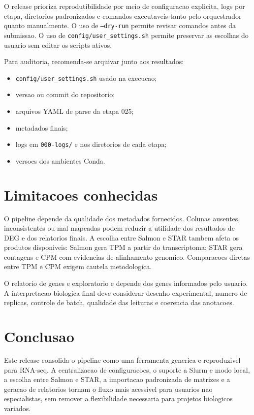 \documentclass[
  12pt,
  oneside,
  a4paper,
  chapter=TITLE,
  section=TITLE,
  brazil
]{abntex2}
\begin{document}
O release prioriza reprodutibilidade por meio de configuracao explicita, logs por etapa, diretorios padronizados e comandos executaveis tanto pelo orquestrador quanto manualmente. O uso de \texttt{--dry-run} permite revisar comandos antes da submissao. O uso de \texttt{config/user\_settings.sh} permite preservar as escolhas do usuario sem editar os scripts ativos.

Para auditoria, recomenda-se arquivar junto aos resultados:

\begin{itemize}[noitemsep]
  \item \texttt{config/user\_settings.sh} usado na execucao;
  \item versao ou commit do repositorio;
  \item arquivos YAML de parse da etapa 025;
  \item metadados finais;
  \item logs em \texttt{000-logs/} e nos diretorios de cada etapa;
  \item versoes dos ambientes Conda.
\end{itemize}

\chapter{Limitacoes conhecidas}

O pipeline depende da qualidade dos metadados fornecidos. Colunas ausentes, inconsistentes ou mal mapeadas podem reduzir a utilidade dos resultados de DEG e dos relatorios finais. A escolha entre Salmon e STAR tambem afeta os produtos disponiveis: Salmon gera TPM a partir do transcriptoma; STAR gera contagens e CPM com evidencias de alinhamento genomico. Comparacoes diretas entre TPM e CPM exigem cautela metodologica.

O relatorio de genes e exploratorio e depende dos genes informados pelo usuario. A interpretacao biologica final deve considerar desenho experimental, numero de replicas, controle de batch, qualidade das leituras e coerencia das anotacoes.

\chapter{Conclusao}

Este release consolida o pipeline como uma ferramenta generica e reproduzivel para RNA-seq. A centralizacao de configuracoes, o suporte a Slurm e modo local, a escolha entre Salmon e STAR, a importacao padronizada de matrizes e a geracao de relatorios tornam o fluxo mais acessivel para usuarios nao especialistas, sem remover a flexibilidade necessaria para projetos biologicos variados.

\postextual

\nocite{*}

\end{document}
